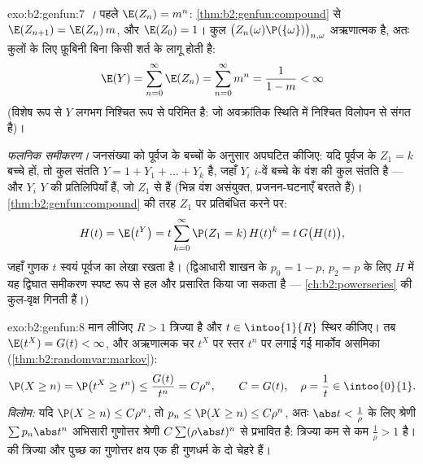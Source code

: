 \begin{solution}{exo:b2:genfun:7}
\emph{।} पहले $\E(Z_n) = m^n$: \cref{thm:b2:genfun:compound} से $\E(Z_{n+1}) = \E(Z_n)\,m$, और $\E(Z_0) = 1$। कुल $\bigl(Z_n(\omega)\P(\{\omega\})
\bigr)_{n, \omega}$
अऋणात्मक है, अतः कुलों के लिए फ़ूबिनी बिना किसी शर्त के लागू होती
है:
\[
\E(Y) = \sum_{n=0}^{\infty}\E(Z_n)
= \sum_{n=0}^\infty m^n = \frac{1}{1 - m} < \infty
\]
(विशेष रूप से $Y$ लगभग निश्चित रूप से परिमित है: जो अवक्रांतिक
स्थिति में निश्चित विलोपन से संगत है)।

\emph{फलनिक समीकरण।} जनसंख्या को पूर्वज के बच्चों के अनुसार अपघटित
कीजिए: यदि पूर्वज के $Z_1 = k$ बच्चे हों, तो कुल संतति $Y = 1 + Y_1 + \dots + Y_k$ है, जहाँ $Y_i$
$i$-वें बच्चे के वंश की कुल संतति है --- और $Y_i$ $Y$ की 
प्रतिलिपियाँ हैं, जो $Z_1$ से  हैं (भिन्न वंश असंयुक्त,
 प्रजनन-घटनाएँ बरतते हैं)। \cref{thm:b2:genfun:compound} की तरह $Z_1$ पर प्रतिबंधित
करने पर:
\[
H(t) = \E\bigl(t^Y\bigr)
= t\sum_{k=0}^\infty \P(Z_1 = k)\,H(t)^k
= t\,G\bigl(H(t)\bigr),
\]
जहाँ गुणक $t$ स्वयं पूर्वज का लेखा रखता है। (द्विआधारी शाखन के
 $p_0 = 1 - p$, $p_2 = p$ के लिए $H$ में यह द्विघात समीकरण स्पष्ट रूप से हल
और प्रसारित किया जा सकता है --- \cref{ch:b2:powerseries} की  कुल-वृक्ष
गिनती हैं।)
\end{solution}

\begin{solution}{exo:b2:genfun:8}
मान लीजिए $R > 1$ त्रिज्या है और $t \in \intoo{1}{R}$ स्थिर कीजिए। तब $\E(t^X) = G(t) < \infty$, और अऋणात्मक
चर $t^X$ पर स्तर $t^n$ पर लगाई गई मार्कोव असमिका (\cref{thm:b2:randomvar:markov}):
\[
\P(X \geq n) = \P\bigl(t^X \geq t^n\bigr)
\leq \frac{G(t)}{t^n} = C\rho^n,
\qquad C = G(t),\quad \rho = \frac1t \in \intoo{0}{1}.
\]
\emph{विलोम:} यदि $\P(X \geq n) \leq C\rho^n$, तो $p_n \leq
\P(X \geq n) \leq C\rho^n$, अतः $\abs t < \frac1\rho$ के लिए श्रेणी $\sum p_n\abs t^n$
अभिसारी गुणोत्तर श्रेणी $C\sum(\rho\abs t)^n$ से प्रभावित है: त्रिज्या कम से कम
$\frac1\rho > 1$ है।  की त्रिज्या और पुच्छ का गुणोत्तर क्षय एक ही
गुणधर्म के दो चेहरे हैं।
\end{solution}

